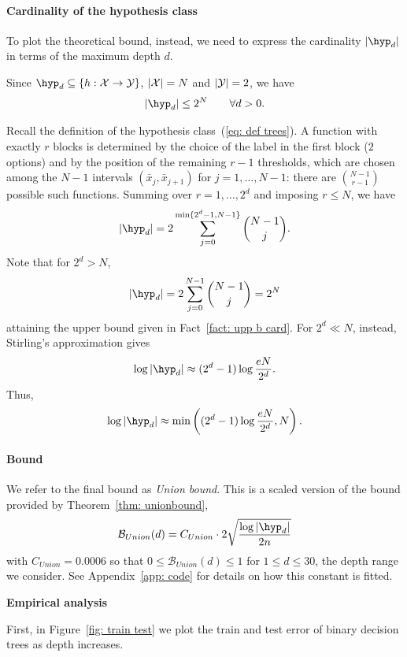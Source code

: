 \documentclass[reqno]{amsart}
\begin{document}
\paragraph{Cardinality of the hypothesis class} To plot the theoretical bound, instead, we need to express the cardinality $\vert \hyp_d\vert$ in terms of the maximum depth $d$. 
\begin{fact}\label{fact: upp b card}
Since $\hyp_d \subseteq \{h:\X \to \Y\}$, $\vert \mathcal{X}\vert = N$ and $\vert \mathcal{Y} \vert = 2$, we have 
\[
\vert \hyp_d\vert \le 2^N \qquad \forall d>0.
\]
\end{fact}
Recall the definition of the hypothesis class~(\ref{eq: def trees}). A function with exactly $r$ blocks is determined by the choice of the label in the first block ($2$ options) and by the position of the remaining $r-1$ thresholds, which are chosen among the $N-1$ intervals $(\bar x_j, \bar x_{j+1})$ for $j =1,\ldots, N-1$: there are $\binom{N-1}{r-1}$ possible such functions. Summing over $r = 1,\ldots, 2^d$ and imposing $r\le N$, we have
\[
\vert \hyp_d\vert = 2 \sum_{j = 0}^{\min\{2^d -1, N-1\}}\binom{N-1}{j}.
\]
Note that for $2^d > N$, 
\[
\vert \hyp_d\vert = 2 \sum_{j = 0}^{ N-1}\binom{N-1}{j} = 2^N
\]
attaining the upper bound given in Fact~\ref{fact: upp b card}. For $2^d \ll N$, instead, Stirling's approximation gives
\[
\log \vert\hyp_d\vert \approx (2^d -1) \log\frac{eN}{2^d}.
\]
Thus,
\begin{equation}\label{eq: log Hd}
\log \vert\hyp_d\vert \approx \min \left((2^d -1) \log\frac{eN}{2^d}, N\right). 
\end{equation}

\paragraph{Bound} We refer to the final bound as {\it Union bound}. This is a scaled version of the bound provided by Theorem~\ref{thm: unionbound},
\begin{equation}\label{eq: union bound}
\mathcal B_{{Union}} (d) = C_{Union} \cdot 2\sqrt{\frac{\log \vert \hyp_d \vert}{2n}}
\end{equation}
with $C_{Union} = 0.0006$ so that $0\le \mathcal B_{Union} (d) \le 1$ for $1\le d \le 30$, the depth range we consider. See Appendix~\ref{app: code} for details on how this constant is fitted. 


{\bf Empirical analysis}

First, in Figure~\ref{fig: train test} we plot the train and test error of binary decision trees as depth increases.
\end{document}
